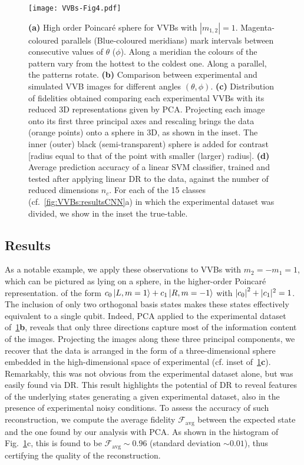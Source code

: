 \begin{figure}[tb]
    \centering
    \texttt{[image: VVBs-Fig4.pdf]}
    \caption{
		\textbf{(a)} High order Poincar\'e sphere for \acp{VVB} with $|m_{1,2}|=1$. Magenta-coloured parallels (Blue-coloured meridians) mark intervals between consecutive values of $\theta$ ($\phi$). 
		Along a meridian the colours of the pattern vary from the hottest to the coldest one. Along a parallel, the patterns rotate. 
		\textbf{(b)}
		Comparison between experimental and simulated \ac{VVB} images for different angles $(\theta, \phi)$.
		\textbf{(c)}
		Distribution of fidelities obtained comparing each experimental VVBs with its reduced 3D representations given by PCA. Projecting each image onto its first three principal axes and rescaling brings the data (orange points) onto a sphere in 3D, as shown in the inset. The inner (outer) black (semi-transparent) sphere is added for contrast [radius equal to that of the point with smaller (larger) radius].
		\textbf{(d)}
		Average prediction accuracy of a linear \ac{SVM} classifier, trained and tested after applying linear DR to the data, against the number of reduced dimensions $n_c$.
		For each of the 15 classes (cf.~\cref{fig:VVBs:resultsCNN}a) in which the experimental dataset was divided, we show in the inset the true-table. 
    }%
    \label{fig:VVBs:PCAresults}
\end{figure}


\subsection{Results}

As a notable example, we apply these observations to VVBs with $m_2=-m_1=1$, which can be pictured as lying on a sphere, in the higher-order Poincaré representation. 
of the form $c_0 \ket{L,m=1} + c_1 \ket{R, m=-1}$ with $\abs{c_0}^2+|c_1|^2=1$.
The inclusion of only two orthogonal basis states makes these states effectively equivalent to a single qubit. 
Indeed, \ac{PCA} applied to the experimental dataset of~\cref{fig:VVBs:PCAresults}\textbf{b}, 
reveals that only three directions capture most of the information content of the images. Projecting the images along these three principal components, we recover that the data is arranged in the form of a three-dimensional sphere embedded in the high-dimensional space of experimental (cf. inset of~\cref{fig:VVBs:PCAresults}\textbf{c}).
Remarkably, this was not obvious from the experimental dataset alone, but was easily found via \ac{DR}. This result highlights the potential of \ac{DR} to  reveal features of the underlying states generating a given experimental dataset, also in the presence of experimental noisy conditions.
To assess the accuracy of such reconstruction, we compute the average fidelity $\mathcal F_{\text{avg}}$ between the expected state and the one found by our analysis with PCA. As shown in the histogram of Fig.~\ref{fig:VVBs:PCAresults}c,  this is found to be $\mathcal F_{\text{avg}}\sim0.96$ (standard deviation $\sim0.01$), thus certifying the quality of the reconstruction.

